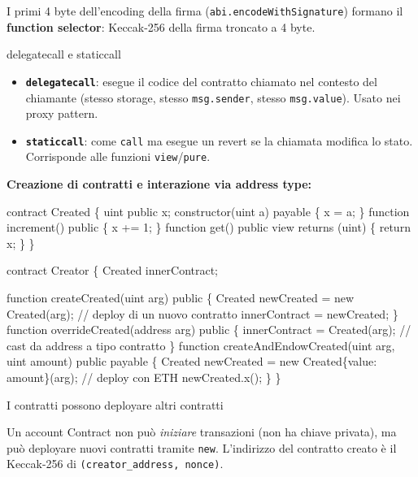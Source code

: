 \documentclass[
  italian,
  openany]{book}
\newenvironment{Shaded}{\begin{snugshade}}{\end{snugshade}}
\newcommand{\NormalTok}[1]{#1}
\providecommand{\tightlist}{%
  \setlength{\itemsep}{0pt}\setlength{\parskip}{0pt}}
\begin{document}
I primi 4 byte dell'encoding della firma
(\texttt{abi.encodeWithSignature}) formano il \textbf{function
selector}: Keccak-256 della firma troncato a 4 byte.

\begin{calloutnote}{delegatecall e staticcall}

\begin{itemize}
\tightlist
\item
  \textbf{\texttt{delegatecall}}: esegue il codice del contratto
  chiamato nel contesto del chiamante (stesso storage, stesso
  \texttt{msg.sender}, stesso \texttt{msg.value}). Usato nei proxy
  pattern.
\item
  \textbf{\texttt{staticcall}}: come \texttt{call} ma esegue un revert
  se la chiamata modifica lo stato. Corrisponde alle funzioni
  \texttt{view}/\texttt{pure}.
\end{itemize}

\end{calloutnote}

\textbf{Creazione di contratti e interazione via address type:}

\begin{Shaded}
\begin{Highlighting}[]
\NormalTok{contract Created \{}
\NormalTok{    uint public x;}
\NormalTok{    constructor(uint a) payable \{ x = a; \}}
\NormalTok{    function increment() public \{ x += 1; \}}
\NormalTok{    function get() public view returns (uint) \{ return x; \}}
\NormalTok{\}}

\NormalTok{contract Creator \{}
\NormalTok{    Created innerContract;}

\NormalTok{    function createCreated(uint arg) public \{}
\NormalTok{        Created newCreated = new Created(arg);   // deploy di un nuovo contratto}
\NormalTok{        innerContract = newCreated;}
\NormalTok{    \}}
\NormalTok{    function overrideCreated(address arg) public \{}
\NormalTok{        innerContract = Created(arg);            // cast da address a tipo contratto}
\NormalTok{    \}}
\NormalTok{    function createAndEndowCreated(uint arg, uint amount) public payable \{}
\NormalTok{        Created newCreated = new Created\{value: amount\}(arg); // deploy con ETH}
\NormalTok{        newCreated.x();}
\NormalTok{    \}}
\NormalTok{\}}
\end{Highlighting}
\end{Shaded}

\begin{callouttip}{I contratti possono deployare altri contratti}

Un account Contract non può \emph{iniziare} transazioni (non ha chiave
privata), ma può deployare nuovi contratti tramite \texttt{new}.
L'indirizzo del contratto creato è il Keccak-256 di
\texttt{(creator\_address,\ nonce)}.

\end{callouttip}
\end{document}
